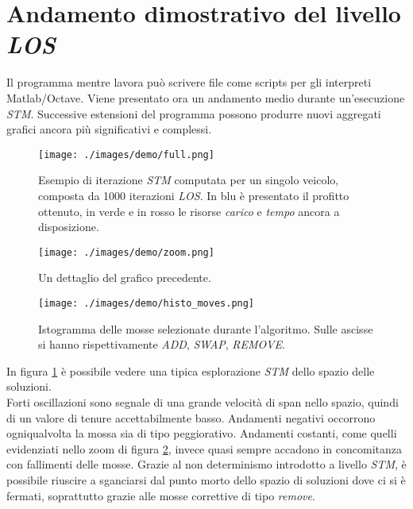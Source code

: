 \section{Andamento dimostrativo del livello \emph{LOS}}
Il programma mentre lavora può scrivere file come scripts per gli interpreti Matlab/Octave. Viene presentato ora un andamento medio durante un'esecuzione \emph{STM}.
Successive estensioni del programma possono produrre nuovi aggregati grafici ancora più significativi e complessi.
	\begin{figure}[H] 
	 	\begin{center}\texttt{[image: ./images/demo/full.png]}
	 	\end{center} 
	 	\caption{Esempio di iterazione \emph{STM} computata per un singolo veicolo, composta da 1000 iterazioni \emph{LOS}. 
	 			In blu è presentato il profitto ottenuto, in verde e in rosso le risorse \emph{carico} e \emph{tempo} ancora a disposizione.}
	 	\label{fig:demoFull}
 	\end{figure}
 	
 	\begin{figure}[H] 
	 	\begin{center}\texttt{[image: ./images/demo/zoom.png]}
	 	\end{center} 
	 	\caption{Un dettaglio del grafico precedente.}
	 	\label{fig:demoZoom}
 	\end{figure}
 	
 	\begin{figure}[H] 
	 	\begin{center}\texttt{[image: ./images/demo/histo\_moves.png]}
	 	\end{center} 
	 	\caption{Istogramma delle mosse selezionate durante l'algoritmo. Sulle
	 	ascisse si hanno rispettivamente \emph{ADD}, \emph{SWAP}, \emph{REMOVE}.}
	 	\label{fig:demoHisto}
 	\end{figure}

In figura \ref{fig:demoFull} è possibile vedere una tipica esplorazione \emph{STM} dello spazio delle soluzioni. \\
Forti oscillazioni sono segnale di una grande velocità di span nello spazio, quindi di un valore di tenure accettabilmente basso. 
Andamenti negativi occorrono ogniqualvolta la mossa sia di tipo peggiorativo. 
Andamenti costanti, come quelli evidenziati nello zoom di figura \ref{fig:demoZoom}, invece quasi sempre accadono in concomitanza con fallimenti
delle mosse. Grazie al non determinismo introdotto a livello \emph{STM}, è possibile riuscire a sganciarsi dal punto morto dello spazio di soluzioni 
dove ci si è fermati, soprattutto grazie alle mosse correttive di tipo \emph{remove}.

